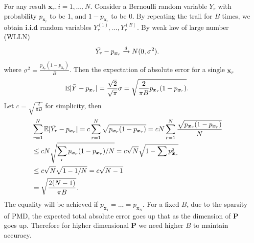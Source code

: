 \documentclass[12pt]{article}
\newcommand{\EE}{\mathbb{E}}
\newcommand{\Pmat}{\mathbf{P}}
\newcommand{\PMD}{\textrm{PMD}}
\newcommand{\xvec}{\boldsymbol{x}}
\begin{document}
For any result $\xvec_r,i=1,\dots,N$. Consider a Bernoulli random variable $Y_r$ with probability $p_{\xvec_r}$ to be 1, and $1-p_{\xvec_r}$ to be 0. By repeating the trail for $B$ times, we obtain $\textbf{i.i.d}$ random variables $Y_r^{(1)},\dots,Y_r^{(B)}$. By weak law of large number (WLLN)
\begin{equation*}
    \Bar{Y_r}-p_{\xvec_r} \xrightarrow{d} N(0,\sigma^2).
\end{equation*}
where $\sigma^2 = \frac{p_{\xvec_r}(1-p_{\xvec_r})}{B}$. Then the expectation of absolute error for a single $\xvec_r$
\begin{equation*}
    \EE |\Bar{Y}-p_{\xvec_r}| = \frac{\sqrt{2}}{\sqrt{\pi}}\sigma = \sqrt{\frac{2}{\pi B}p_{\xvec_r}(1-p_{\xvec_r})}.
\end{equation*}
Let $c = \sqrt{\frac{2}{\pi B}}$ for simplicity, then
\begin{align*}
    & \sum_{r=1}^{N}\EE |\Bar{Y_r}-p_{\xvec_r}| = c \sum_{r=1}^{N} \sqrt{p_{\xvec_r}(1-p_{\xvec_r})}  = c N \sum_{r=1}^{N}\frac{\sqrt{p_{\xvec_r}(1-p_{\xvec_r})}}{N} \\
    & \leq c N \sqrt{\sum_{r}p_{\xvec_r}(1-p_{\xvec_r})/N} = c \sqrt{N} \sqrt{1-\sum p_{\xvec_{r}}^2}\\ &\leq c \sqrt{N} \sqrt{1-1/N} = c\sqrt{N-1}\\
    & = \sqrt{\frac{2(N-1)}{\pi B}}.
\end{align*}
The equality will be achieved if $p_{\xvec_1} = \dots = p_{\xvec_N}$. For a fixed $B$, due to the sparsity of $\PMD$, the expected total absolute error goes up that as the dimension of $\Pmat$ goes up. Therefore for higher dimensional $\Pmat$ we need higher $B$ to maintain accuracy.

\end{document}
